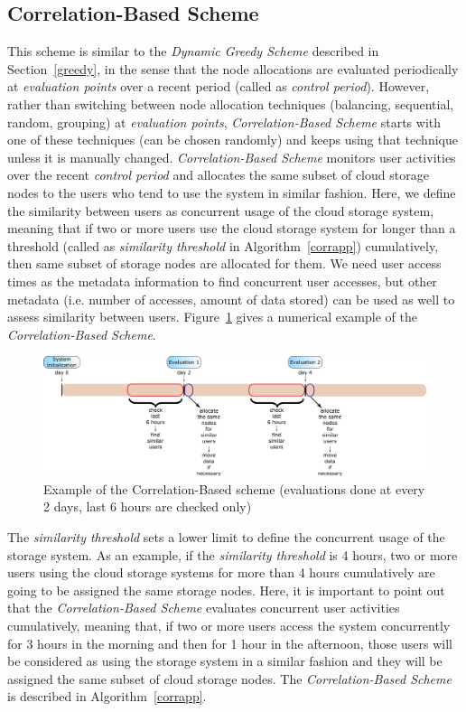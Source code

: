 \documentclass[preprint,12pt]{elsarticle}
\begin{document}
\subsection{Correlation-Based Scheme}
\label{correlation}
This scheme is similar to the \textit{Dynamic Greedy Scheme} described in Section~\ref{greedy}, in the sense that
the node allocations are evaluated periodically at \textit{evaluation points} over a recent period (called
as \textit{control period}). However, rather than switching between node allocation
techniques (balancing, sequential, random, grouping) at \textit{evaluation points}, \textit{Correlation-Based Scheme}
starts with one of these techniques (can be chosen randomly) and keeps using that technique unless it is manually
changed. \textit{Correlation-Based Scheme} monitors user activities over the recent \textit{control period} and
allocates the same subset of cloud storage nodes to the users who tend to use the system in similar fashion.
Here, we define the similarity between users as concurrent usage of the cloud storage system, meaning that if
two or more users use the cloud storage system for longer than a threshold (called as \textit{similarity threshold}
in Algorithm~\ref{corrapp}) cumulatively, then same subset of storage nodes are allocated for them. We need
user access times as the metadata information to find concurrent user accesses, but other metadata (i.e.
number of accesses, amount of data stored) can be used as well to assess similarity between users.
Figure~\ref{correlation_examples} gives a numerical example of the \textit{Correlation-Based Scheme}.

\begin{figure}[!htbp]
\centering
\includegraphics[width=\columnwidth,keepaspectratio]{FIG4.pdf}
\caption{Example of the Correlation-Based scheme (evaluations done at every 2 days, last 6 hours are checked only)}
\label{correlation_examples}
\end{figure}

The \textit{similarity threshold} sets a lower limit to define the concurrent usage of the storage system. As
an example, if the \textit{similarity threshold} is 4 hours, two or more users using the cloud storage systems
for more than 4 hours cumulatively are going to be assigned the same storage nodes. Here, it is important to point
out that the \textit{Correlation-Based Scheme} evaluates concurrent user activities cumulatively, meaning that, if
two or more users access the system concurrently for 3 hours in the morning and then for 1 hour in the afternoon,
those users will be considered as using the storage system in a similar fashion and they will be assigned the
same subset of cloud storage nodes. The \textit{Correlation-Based Scheme} is described in
Algorithm~\ref{corrapp}. 
\end{document}
